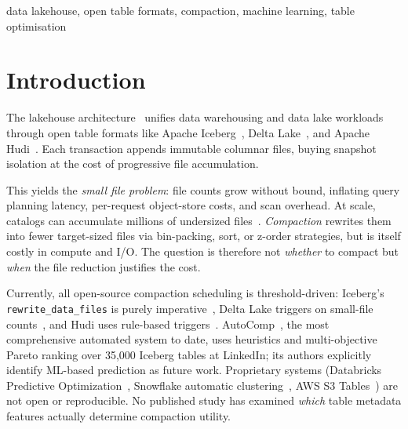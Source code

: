 \documentclass[conference, 10pt]{IEEEtran}
\begin{document}
\begin{IEEEkeywords}
data lakehouse, open table formats, compaction, machine learning, table optimisation
\end{IEEEkeywords}

\section{Introduction}

The lakehouse architecture~\cite{armbrust2021lakehouse} unifies data warehousing
and data lake workloads through open table formats like Apache
Iceberg~\cite{iceberg_spec}, Delta Lake~\cite{armbrust2020delta}, and Apache
Hudi~\cite{hudi_compaction}. Each transaction appends immutable columnar
files, buying snapshot isolation at the cost of progressive file
accumulation.

This yields the \emph{small file problem}: file counts grow without bound,
inflating query planning latency, per-request object-store costs, and scan
overhead. At scale, catalogs can accumulate millions of undersized
files~\cite{gruenheid2025autocomp}. \emph{Compaction} rewrites them into
fewer target-sized files via bin-packing, sort, or z-order strategies, but
is itself costly in compute and I/O. The question is therefore not
\emph{whether} to compact but \emph{when} the file reduction justifies the
cost.

Currently, all open-source compaction scheduling is threshold-driven:
Iceberg's \texttt{rewrite\_data\_files} is purely imperative~\cite{iceberg_spec},
Delta Lake triggers on small-file counts~\cite{armbrust2020delta}, and Hudi
uses rule-based triggers~\cite{hudi_compaction}.
AutoComp~\cite{gruenheid2025autocomp}, the most comprehensive automated system
to date, uses heuristics and multi-objective Pareto ranking over 35{,}000
Iceberg tables at LinkedIn; its authors explicitly identify ML-based prediction
as future work. Proprietary systems (Databricks Predictive
Optimization~\cite{databricks_predictive_optimization}, Snowflake automatic
clustering~\cite{snowflake_autoclustering}, AWS S3
Tables~\cite{aws_s3tables_compaction}) are not open or reproducible.
No published study has examined \emph{which} table metadata features actually
determine compaction utility.
\end{document}
